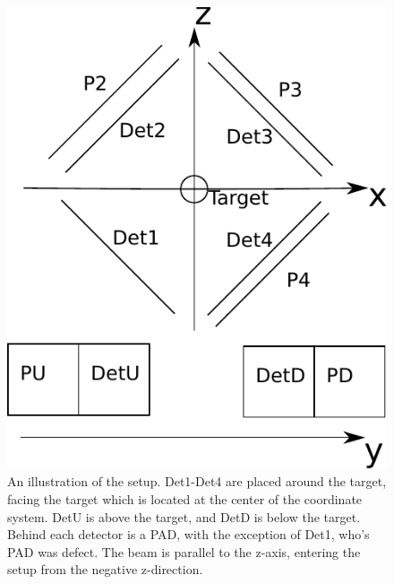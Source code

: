 \begin{figure}[H]
	\centering
	\includegraphics[width=.6\linewidth]{../figures/opstilling_better.pdf}
	\caption{An illustration of the setup. Det1-Det4 are placed around the target, facing the target which is located at the center of the coordinate system. DetU is above the target, and DetD is below the target. Behind each detector is a PAD, with the exception of Det1, who's PAD was defect. The beam is parallel to the z-axis, entering the setup from the negative z-direction.}
	\label{fig:opstilling}
\end{figure}

